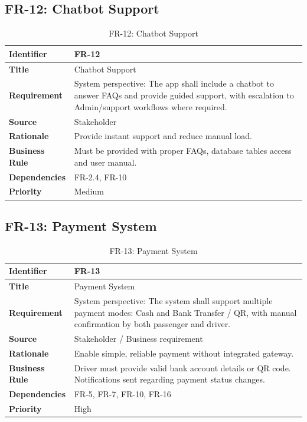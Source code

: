 \subsection{FR-12: Chatbot Support}

\begin{longtable}{|p{3cm}|p{12cm}|}
\caption{FR-12: Chatbot Support}
\label{tab:fr-12} \\
\hline
\rowcolor{lightgray!30}
\textbf{Identifier} & FR-12 \\
\hline
\textbf{Title} & Chatbot Support \\
\hline
\textbf{Requirement} & System perspective: The app shall include a chatbot to answer FAQs and provide guided support, with escalation to Admin/support workflows where required. \\
\hline
\textbf{Source} & Stakeholder \\
\hline
\textbf{Rationale} & Provide instant support and reduce manual load. \\
\hline
\textbf{Business Rule} & Must be provided with proper FAQs, database tables access and user manual. \\
\hline
\textbf{Dependencies} & FR-2.4, FR-10 \\
\hline
\textbf{Priority} & Medium \\
\hline
\end{longtable}

\subsection{FR-13: Payment System}

\begin{longtable}{|p{3cm}|p{12cm}|}
\caption{FR-13: Payment System}
\label{tab:fr-13} \\
\hline
\rowcolor{lightgray!30}
\textbf{Identifier} & FR-13 \\
\hline
\textbf{Title} & Payment System \\
\hline
\textbf{Requirement} & System perspective: The system shall support multiple payment modes: Cash and Bank Transfer / QR, with manual confirmation by both passenger and driver. \\
\hline
\textbf{Source} & Stakeholder / Business requirement \\
\hline
\textbf{Rationale} & Enable simple, reliable payment without integrated gateway. \\
\hline
\textbf{Business Rule} & Driver must provide valid bank account details or QR code. Notifications sent regarding payment status changes. \\
\hline
\textbf{Dependencies} & FR-5, FR-7, FR-10, FR-16 \\
\hline
\textbf{Priority} & High \\
\hline
\end{longtable}

